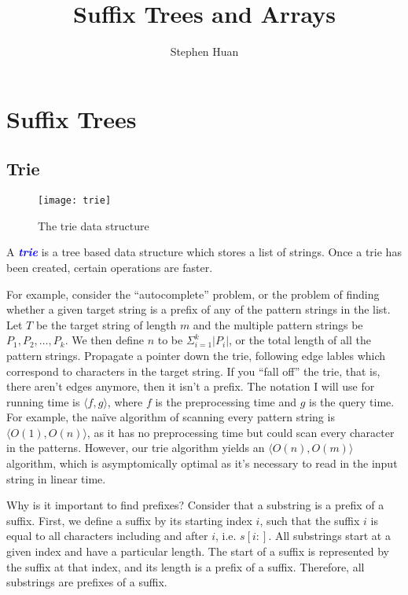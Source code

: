 \documentclass[11pt, oneside]{article}
\title{Suffix Trees and Arrays}
\author{Stephen Huan}
\newcommand{\emphasis}[1]{\textcolor{blue}{\textbf{\textit{#1}}}}
\begin{document}
\maketitle

\section{Suffix Trees}
\subsection{Trie}

\begin{figure}[h!]
\centering
\texttt{[image: trie]}
\caption{The trie data structure}
\end{figure}

A \emphasis{trie} is a tree based data structure which stores a list of strings.
Once a trie has been created, certain operations are faster.

For example, consider the ``autocomplete'' problem, or the problem of
finding whether a given target string is a prefix of any of the pattern strings in the list.
Let \( T \) be the target string of length \( m \) and the multiple pattern strings be \( P_1, P_2, \dots, P_k \).
We then define \( n \) to be \( \Sigma^{k}_{i = 1} |P_i| \), or the total length of all the pattern strings.
Propagate a pointer down the trie, following edge lables which correspond to characters in the target string.
If you ``fall off'' the trie, that is, there aren't edges anymore, then it isn't a prefix.
The notation I will use for running time is \( \langle f, g \rangle \),
where \( f \) is the preprocessing time and \( g \) is the query time.
For example, the naïve algorithm of scanning every pattern string
is \( \langle O(1), O(n) \rangle \), as it has no preprocessing time
but could scan every character in the patterns.
However, our trie algorithm yields an \( \langle O(n), O(m) \rangle \) algorithm,
which is asymptomically optimal as it's necessary to read in the input string in linear time.

Why is it important to find prefixes? Consider that a substring is a prefix of a suffix.
First, we define a suffix by its starting index \( i \), such that the suffix \( i \)
is equal to all characters including and after \( i \), i.e. \( s[i:] \). All substrings
start at a given index and have a particular length. The start of a suffix is represented
by the suffix at that index, and its length is a prefix of a suffix. Therefore,
all substrings are prefixes of a suffix.
\end{document}
